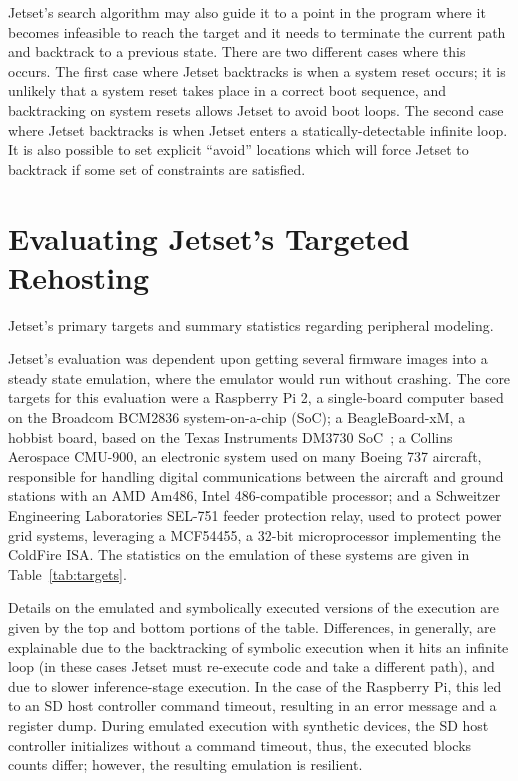 Jetset's search algorithm may also guide it to a point in the program where it becomes infeasible to reach the target and it needs to terminate the current path and backtrack to a previous state.
There are two different cases where this occurs.
The first case where Jetset backtracks is when a system reset occurs; it is unlikely that a system reset takes place in a correct boot sequence, and backtracking on system resets allows Jetset to avoid boot loops.
The second case where Jetset backtracks is when Jetset enters a statically-detectable infinite loop.
It is also possible to set explicit ``avoid'' locations which will force Jetset to backtrack if some set of constraints are satisfied.

\section{Evaluating Jetset's Targeted Rehosting}


\begin{table}
\centering
\caption{Jetset's primary targets and summary statistics regarding peripheral modeling.}
\label{tab:targets}

\end{table}

Jetset's evaluation was dependent upon getting several firmware images into a steady state emulation, where the emulator would run without crashing.
The core targets for this evaluation were a Raspberry Pi 2, a single-board computer based on the Broadcom BCM2836 system-on-a-chip (SoC); a BeagleBoard-xM, a hobbist board, based on the Texas Instruments DM3730 SoC~\cite{bbxm-srm}; a Collins Aerospace CMU-900, an electronic system used on many Boeing 737 aircraft, responsible for handling digital communications between the aircraft and ground stations with an AMD Am486, Intel 486-compatible processor; and a Schweitzer Engineering Laboratories SEL-751 feeder protection relay, used to protect power grid systems, leveraging a MCF54455, a 32-bit microprocessor implementing the ColdFire ISA.
The statistics on the emulation of these systems are given in Table~\ref{tab:targets}.

Details on the emulated and symbolically executed versions of the execution are given by the top and bottom portions of the table. 
Differences, in generally, are explainable due to the backtracking of symbolic execution when it hits an infinite loop (in these cases Jetset must re-execute code and take a different path), and due to slower inference-stage execution.
In the case of the Raspberry Pi, this led to an SD host controller command timeout, resulting in an error message and a register dump. 
During emulated execution with synthetic devices, the SD host controller initializes without a command timeout, thus, the executed blocks counts differ; however, the resulting emulation is resilient. 

